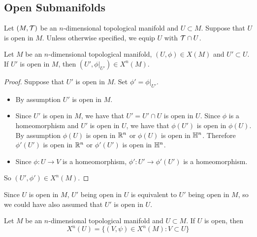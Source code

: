 \documentclass{book}
\begin{document}
	\subsection{Open Submanifolds}
	
	\begin{note} 
		Let $(M, \mathcal{T})$ be an $n$-dimensional topological manifold and $U \subset M$. Suppose that $U$ is open in $M$. Unless otherwise specified, we equip $U$ with $\mathcal{T} \cap U$. 
	\end{note}

	\begin{ex} 
		Let $M$ be an $n$-dimensional topological manifold, $(U, \phi) \in X(M)$ and $U' \subset U$. If $U'$ is open in $M$, then $(U', \phi|_{U'}) \in X^n(M)$. 
	\end{ex}
	
	\begin{proof}
		Suppose that $U'$ is open in $M$. Set $\phi' = \phi|_{U'}$. 
		\begin{itemize}
			\item By assumption $U'$ is open in $M$.
			\item Since $U'$ is open in $M$, we have that $U' = U' \cap U$ is open in $U$. Since $\phi$ is a homeomorphism and $U'$ is open in $U$, we have that $\phi(U')$ is open in $\phi(U)$. By assumption $\phi(U)$ is open in $\mathbb{R}^n$ or $\phi(U)$ is open in $\mathbb{H}^n$. Therefore $\phi'(U')$ is open in $\mathbb{R}^n$ or $\phi'(U')$ is open in $\mathbb{H}^n$.
			\item Since $\phi:U \rightarrow V$ is a homeomorphism, $\phi': U' \rightarrow \phi'(U')$ is a homeomorphism. 
		\end{itemize}
		So $(U', \phi') \in X^n(M)$. 
	\end{proof}
	
	\begin{note}
		Since $U$ is open in $M$, $U'$ being open in $U$ is equivalent to $U'$ being open in $M$, so we could have also assumed that $U'$ is open in $U$.
	\end{note}
	
	\begin{ex} 
		Let $M$ be an $n$-dimensional topological manifold and $U \subset M$. If $U$ is open, then 
		$$X^n(U) = \{(V, \psi) \in X^n(M): V \subset U\}$$
	\end{ex}
	
\end{document}
